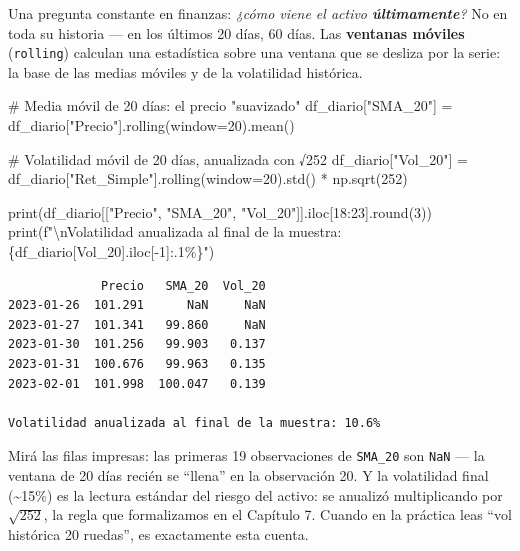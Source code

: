 \documentclass[
  spanish,
  letterpaper,
  DIV=11,
  numbers=noendperiod]{scrreprt}
\newenvironment{Shaded}{\begin{snugshade}}{\end{snugshade}}
\newcommand{\BuiltInTok}[1]{\textcolor[rgb]{0.00,0.23,0.31}{#1}}
\newcommand{\CharTok}[1]{\textcolor[rgb]{0.13,0.47,0.30}{#1}}
\newcommand{\CommentTok}[1]{\textcolor[rgb]{0.37,0.37,0.37}{#1}}
\newcommand{\DecValTok}[1]{\textcolor[rgb]{0.68,0.00,0.00}{#1}}
\newcommand{\NormalTok}[1]{\textcolor[rgb]{0.00,0.23,0.31}{#1}}
\newcommand{\OperatorTok}[1]{\textcolor[rgb]{0.37,0.37,0.37}{#1}}
\newcommand{\SpecialCharTok}[1]{\textcolor[rgb]{0.37,0.37,0.37}{#1}}
\newcommand{\SpecialStringTok}[1]{\textcolor[rgb]{0.13,0.47,0.30}{#1}}
\newcommand{\StringTok}[1]{\textcolor[rgb]{0.13,0.47,0.30}{#1}}
\begin{document}
Una pregunta constante en finanzas: \emph{¿cómo viene el activo
\textbf{últimamente}?} No en toda su historia --- en los últimos 20
días, 60 días. Las \textbf{ventanas móviles} (\texttt{rolling}) calculan
una estadística sobre una ventana que se desliza por la serie: la base
de las medias móviles y de la volatilidad histórica.

\label{rolling-indicators}
\begin{Shaded}
\begin{Highlighting}[]
\CommentTok{\# Media móvil de 20 días: el precio "suavizado"}
\NormalTok{df\_diario[}\StringTok{"SMA\_20"}\NormalTok{] }\OperatorTok{=}\NormalTok{ df\_diario[}\StringTok{"Precio"}\NormalTok{].rolling(window}\OperatorTok{=}\DecValTok{20}\NormalTok{).mean()}

\CommentTok{\# Volatilidad móvil de 20 días, anualizada con √252}
\NormalTok{df\_diario[}\StringTok{"Vol\_20"}\NormalTok{] }\OperatorTok{=}\NormalTok{ df\_diario[}\StringTok{"Ret\_Simple"}\NormalTok{].rolling(window}\OperatorTok{=}\DecValTok{20}\NormalTok{).std() }\OperatorTok{*}\NormalTok{ np.sqrt(}\DecValTok{252}\NormalTok{)}

\BuiltInTok{print}\NormalTok{(df\_diario[[}\StringTok{"Precio"}\NormalTok{, }\StringTok{"SMA\_20"}\NormalTok{, }\StringTok{"Vol\_20"}\NormalTok{]].iloc[}\DecValTok{18}\NormalTok{:}\DecValTok{23}\NormalTok{].}\BuiltInTok{round}\NormalTok{(}\DecValTok{3}\NormalTok{))}
\BuiltInTok{print}\NormalTok{(}\SpecialStringTok{f"}\CharTok{\textbackslash{}n}\SpecialStringTok{Volatilidad anualizada al final de la muestra: }\SpecialCharTok{\{}\NormalTok{df\_diario[}\StringTok{\textquotesingle{}Vol\_20\textquotesingle{}}\NormalTok{]}\SpecialCharTok{.}\NormalTok{iloc[}\OperatorTok{{-}}\DecValTok{1}\NormalTok{]}\SpecialCharTok{:.1\%\}}\SpecialStringTok{"}\NormalTok{)}
\end{Highlighting}
\end{Shaded}

\begin{verbatim}
             Precio   SMA_20  Vol_20
2023-01-26  101.291      NaN     NaN
2023-01-27  101.341   99.860     NaN
2023-01-30  101.256   99.903   0.137
2023-01-31  100.676   99.963   0.135
2023-02-01  101.998  100.047   0.139

Volatilidad anualizada al final de la muestra: 10.6%
\end{verbatim}

Mirá las filas impresas: las primeras 19 observaciones de
\texttt{SMA\_20} son \texttt{NaN} --- la ventana de 20 días recién se
``llena'' en la observación 20. Y la volatilidad final
(\textasciitilde15\%) es la lectura estándar del riesgo del activo: se
anualizó multiplicando por \(\sqrt{252}\), la regla que formalizamos en
el Capítulo 7. Cuando en la práctica leas ``vol histórica 20 ruedas'',
es exactamente esta cuenta.
\end{document}
